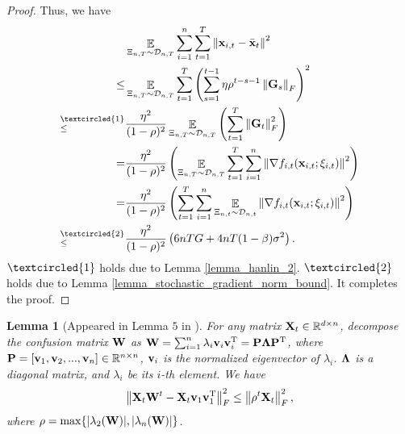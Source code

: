 \documentclass{article}
\newtheorem{Lemma}{\bf{Lemma}}
\begin{document}
\begin{proof}
Thus, we  have
\begin{align}
\nonumber
& \EE_{ \Xi_{n,T} \sim \Dcal_{n,T} } \sum_{i=1}^n\sum_{t=1}^T \lrnorm{\x_{i,t} - \bar{\x}_t}^2  \\ \nonumber 
\le & \EE_{ \Xi_{n,T} \sim \Dcal_{n,T} } \sum_{t=1}^T \lrincir{ \sum_{s=1}^{t-1} \eta \rho^{t-s-1} \lrnorm{\G_s}_F}^2  \\ \nonumber
\refabovecir{\le}{\textcircled{1}} & \frac{\eta^2}{(1-\rho)^2} \EE_{ \Xi_{n,T} \sim \Dcal_{n,T} } \lrincir{  \sum_{t=1}^T \lrnorm{\G_t}_F^2 } \\ \nonumber
= & \frac{\eta^2}{(1-\rho)^2} \lrincir{ \EE_{ \Xi_{n,T} \sim \Dcal_{n,T} } \sum_{t=1}^T \sum_{i=1}^n  \lrnorm{\nabla f_{i,t}(\x_{i,t}; \xi_{i,t})}^2 } \\ \nonumber
= & \frac{\eta^2}{(1-\rho)^2} \lrincir{  \sum_{t=1}^T \sum_{i=1}^n \EE_{ \Xi_{n,t} \sim \Dcal_{n,t} } \lrnorm{\nabla f_{i,t}(\x_{i,t}; \xi_{i,t})}^2 } \\ \nonumber
\refabovecir{\le}{\textcircled{2}} & \frac{\eta^2}{(1-\rho)^2} \lrincir{  6nTG + 4nT (1-\beta) \sigma^2 }.
\end{align} $\textcircled{1}$ holds due to Lemma \ref{lemma_hanlin_2}. $\textcircled{2}$ holds due to Lemma \ref{lemma_stochastic_gradient_norm_bound}.
It completes the proof.


\end{proof}








\begin{Lemma}[Appeared in Lemma $5$ in \citep{Tang:2018un}]
\label{lemma_hanlin_1}
For any matrix ${\bf X}_t\in\mathbb{R}^{d\times n}$, decompose the confusion matrix ${\bf W}$ as ${\bf W} = \sum_{i=1}^n \lambda_i {\bf v}_i {\bf v}_i^{\rm T} = {\bf P} \mathbf{\Lambda} {\bf P}^{\rm T}$, where ${\bf P} = [{\bf v}_1, {\bf v}_2, ..., {\bf v}_n]\in\mathbb{R}^{n\times n}$, ${\bf v}_i$ is the normalized eigenvector of $\lambda_i$. $\mathbf{\Lambda}$ is a diagonal matrix, and $\lambda_i$ be its $i$-th element. We have
\begin{align}
\nonumber
\left\lVert{\bf X}_t {\bf W}^t - {\bf X}_t {\bf v}_1 {\bf v}_1^{\rm T} \right\rVert_F^2 \le \left\lVert\rho^t {\bf X}_t\right\rVert_F^2, 
\end{align} where  $\rho = \max \{| \lambda_2({\bf W}) |, | \lambda_n({\bf W}) |\}$. 

\end{Lemma}
\end{document}
